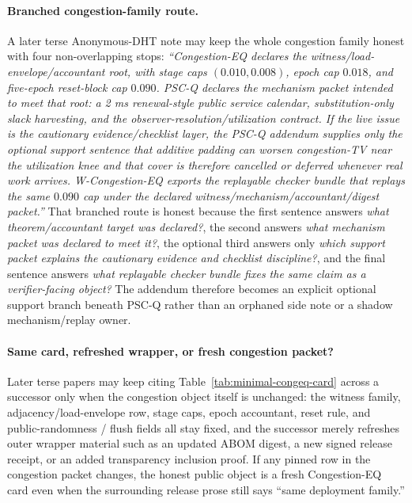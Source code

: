 \documentclass[11pt]{article}
\theoremstyle{definition}
\theoremstyle{remark}
\begin{document}
\paragraph{Branched congestion-family route.}
A later terse Anonymous-DHT note may keep the whole congestion family honest with four non-overlapping stops: \emph{``Congestion-EQ declares the witness/load-envelope/accountant root, with stage caps $(0.010,0.008)$, epoch cap $0.018$, and five-epoch reset-block cap $0.090$. PSC-Q declares the mechanism packet intended to meet that root: a 2 ms renewal-style public service calendar, substitution-only slack harvesting, and the observer-resolution/utilization contract. If the live issue is the cautionary evidence/checklist layer, the PSC-Q addendum supplies only the optional support sentence that additive padding can worsen congestion-TV near the utilization knee and that cover is therefore cancelled or deferred whenever real work arrives. W-Congestion-EQ exports the replayable checker bundle that replays the same $0.090$ cap under the declared witness/mechanism/accountant/digest packet.''}
That branched route is honest because the first sentence answers \emph{what theorem/accountant target was declared?}, the second answers \emph{what mechanism packet was declared to meet it?}, the optional third answers only \emph{which support packet explains the cautionary evidence and checklist discipline?}, and the final sentence answers \emph{what replayable checker bundle fixes the same claim as a verifier-facing object?} The addendum therefore becomes an explicit optional support branch beneath PSC-Q rather than an orphaned side note or a shadow mechanism/replay owner.\cite{series:pscq,series:pscqaddendum,series:wcongeq}

\paragraph{Same card, refreshed wrapper, or fresh congestion packet?}
Later terse papers may keep citing Table~\ref{tab:minimal-congeq-card} across a successor only when the congestion object itself is unchanged: the witness family, adjacency/load-envelope row, stage caps, epoch accountant, reset rule, and public-randomness / flush fields all stay fixed, and the successor merely refreshes outer wrapper material such as an updated ABOM digest, a new signed release receipt, or an added transparency inclusion proof. If any pinned row in the congestion packet changes, the honest public object is a fresh Congestion-EQ card even when the surrounding release prose still says ``same deployment family.''\cite{series:wcongeq,series:evalnotary,anondht_release_receipts}
\end{document}
